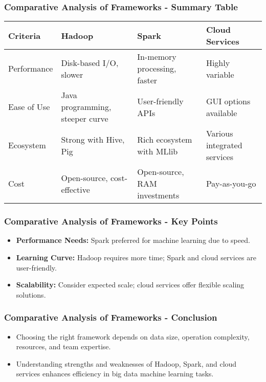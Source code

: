 \documentclass[aspectratio=169]{beamer}
\begin{document}
\begin{frame}[fragile]
    \frametitle{Comparative Analysis of Frameworks - Summary Table}
    \begin{table}[ht]
        \centering
        \begin{tabular}{|l|l|l|l|}
            \hline
            \textbf{Criteria} & \textbf{Hadoop} & \textbf{Spark} & \textbf{Cloud Services} \\ \hline
            Performance & Disk-based I/O, slower & In-memory processing, faster & Highly variable \\ \hline
            Ease of Use & Java programming, steeper curve & User-friendly APIs & GUI options available \\ \hline
            Ecosystem & Strong with Hive, Pig & Rich ecosystem with MLlib & Various integrated services \\ \hline
            Cost & Open-source, cost-effective & Open-source, RAM investments & Pay-as-you-go \\ \hline
        \end{tabular}
    \end{table}
\end{frame}

\begin{frame}[fragile]
    \frametitle{Comparative Analysis of Frameworks - Key Points}
    \begin{itemize}
        \item \textbf{Performance Needs:} Spark preferred for machine learning due to speed.
        \item \textbf{Learning Curve:} Hadoop requires more time; Spark and cloud services are user-friendly.
        \item \textbf{Scalability:} Consider expected scale; cloud services offer flexible scaling solutions.
    \end{itemize}
\end{frame}

\begin{frame}[fragile]
    \frametitle{Comparative Analysis of Frameworks - Conclusion}
    \begin{itemize}
        \item Choosing the right framework depends on data size, operation complexity, resources, and team expertise.
        \item Understanding strengths and weaknesses of Hadoop, Spark, and cloud services enhances efficiency in big data machine learning tasks.
    \end{itemize}
\end{frame}
\end{document}
